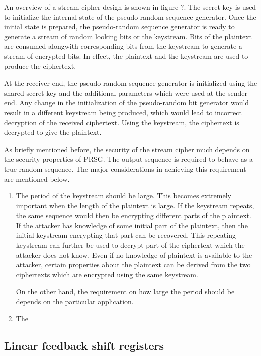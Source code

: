 An overview of a stream cipher design is shown in figure ?. The secret key is used to initialize the internal state of the pseudo-random sequence generator. Once the initial state is prepared, the pseudo-random sequence generator is ready to generate a stream of random looking bits or the keystream. Bits of the plaintext are consumed alongwith corresponding bits from the keystream to generate a stream of encrypted bits. In effect, the plaintext and the keystream are used to produce the ciphertext.

At the receiver end, the pseudo-random sequence generator is initialized using the shared secret key and the additional parameters which were used at the sender end. Any change in the initialization of the pseudo-random bit generator would result in a different keystream being produced, which would lead to incorrect decryption of the received ciphertext. Using the keystream, the ciphertext is decrypted to give the plaintext. 

As briefly mentioned before, the security of the stream cipher much depends on the security properties of PRSG. The output sequence is required to behave as a true random sequence. The major considerations in achieving this requirement are mentioned below.
\begin{enumerate}
\item The period of the keystream should be large. This becomes extremely important when the length of the plaintext is large. If the keystream repeats, the same sequence would then be encrypting different parts of the plaintext. If the attacker has knowledge of some initial part of the plaintext, then the initial keystream encrypting that part can be recovered. This repeating keystream can further be used to decrypt part of the ciphertext which the attacker does not know. Even if no knowledge of plaintext is available to the attacker, certain properties about the plaintext can be derived from the two ciphertexts which are encrypted using the same keystream.

On the other hand, the requirement on how large the period should be depends on the particular application.
\item The 
\end{enumerate}

\subsection{Linear feedback shift registers} 

